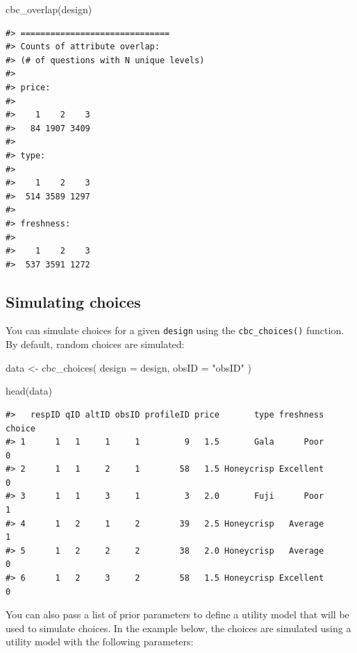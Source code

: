 \documentclass[
  12pt,
]{article}
\newenvironment{Shaded}{\begin{snugshade}}{\end{snugshade}}
\newcommand{\AttributeTok}[1]{\textcolor[rgb]{0.77,0.63,0.00}{#1}}
\newcommand{\FunctionTok}[1]{\textcolor[rgb]{0.00,0.00,0.00}{#1}}
\newcommand{\NormalTok}[1]{#1}
\newcommand{\OtherTok}[1]{\textcolor[rgb]{0.56,0.35,0.01}{#1}}
\newcommand{\StringTok}[1]{\textcolor[rgb]{0.31,0.60,0.02}{#1}}
\begin{document}
\begin{Shaded}
\begin{Highlighting}[]
\FunctionTok{cbc\_overlap}\NormalTok{(design)}
\end{Highlighting}
\end{Shaded}

\begin{verbatim}
#> ==============================
#> Counts of attribute overlap:
#> (# of questions with N unique levels)
#> 
#> price:
#> 
#>    1    2    3 
#>   84 1907 3409 
#> 
#> type:
#> 
#>    1    2    3 
#>  514 3589 1297 
#> 
#> freshness:
#> 
#>    1    2    3 
#>  537 3591 1272
\end{verbatim}

\hypertarget{simulating-choices}{%
\subsection{Simulating choices}\label{simulating-choices}}

You can simulate choices for a given \texttt{design} using the
\texttt{cbc\_choices()} function. By default, random choices are
simulated:

\begin{Shaded}
\begin{Highlighting}[]
\NormalTok{data }\OtherTok{\textless{}{-}} \FunctionTok{cbc\_choices}\NormalTok{(}
  \AttributeTok{design =}\NormalTok{ design,}
  \AttributeTok{obsID  =} \StringTok{"obsID"}
\NormalTok{)}

\FunctionTok{head}\NormalTok{(data)}
\end{Highlighting}
\end{Shaded}

\begin{verbatim}
#>   respID qID altID obsID profileID price       type freshness choice
#> 1      1   1     1     1         9   1.5       Gala      Poor      0
#> 2      1   1     2     1        58   1.5 Honeycrisp Excellent      0
#> 3      1   1     3     1         3   2.0       Fuji      Poor      1
#> 4      1   2     1     2        39   2.5 Honeycrisp   Average      1
#> 5      1   2     2     2        38   2.0 Honeycrisp   Average      0
#> 6      1   2     3     2        58   1.5 Honeycrisp Excellent      0
\end{verbatim}

You can also pass a list of prior parameters to define a utility model
that will be used to simulate choices. In the example below, the choices
are simulated using a utility model with the following parameters:
\end{document}
